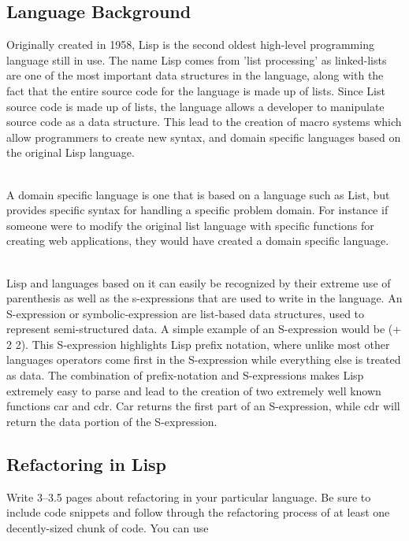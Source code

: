 \documentclass{article}
\begin{document}

\subsection*{Language Background}

Originally created in 1958, Lisp is the second oldest high-level programming language still in use. The name Lisp comes from 'list processing' as linked-lists are one of the most important data structures in the language, along with the fact that the entire source code for the language is made up of lists. Since List source code is made up of lists, the language allows a developer to manipulate source code as a data structure. This lead to the creation of macro systems which allow programmers to create new syntax, and domain specific languages based on the original Lisp language.

\\A domain specific language is one that is based on a language such as List, but provides specific syntax for handling a specific problem domain. For instance if someone were to modify the original list language with specific functions for creating web applications, they would have created a domain specific language.

\\Lisp and languages based on it can easily be recognized by their extreme use of parenthesis as well as the s-expressions that are used to write in the language. An S-expression or symbolic-expression are list-based data structures, used to represent semi-structured data. A simple example of an S-expression would be (+ 2 2). This S-expression highlights Lisp prefix notation, where unlike most other languages operators come first in the S-expression while everything else is treated as data. The combination of prefix-notation and S-expressions makes Lisp extremely easy to parse and lead to the creation of two extremely well known functions car and cdr. Car returns the first part of an S-expression, while cdr will return the data portion of the S-expression.


\subsection*{Refactoring in Lisp}

Write 3--3.5 pages about refactoring in your particular language. Be sure to include code snippets and follow through the refactoring process of at least one decently-sized chunk of code. You can use
\end{document}
